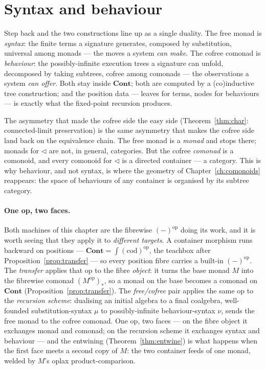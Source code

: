 \documentclass[11pt,a4paper]{book}
\newcommand{\Cont}{\mathbf{Cont}}
\newcommand{\op}{^{\mathrm{op}}}
\newcommand{\cod}{\mathrm{cod}}
\theoremstyle{plain}
\theoremstyle{definition}
\theoremstyle{remark}
\begin{document}
\section{Syntax and behaviour}
\label{sec:moncomon-outlook}

Step back and the two constructions line up as a single duality. The free monad is
\emph{syntax}: the finite terms a signature generates, composed by substitution, universal
among monads --- the moves a system \emph{can make}. The cofree comonad is \emph{behaviour}:
the possibly-infinite execution trees a signature can unfold, decomposed by taking subtrees,
cofree among comonads --- the observations a system \emph{can offer}. Both stay inside
$\Cont$; both are computed by a (co)inductive tree construction; and the position data --- leaves
for terms, nodes for behaviours --- is exactly what the fixed-point recursion produces.

The asymmetry that made the cofree side the easy side (Theorem~\ref{thm:char}: connected-limit
preservation) is the same asymmetry that makes the cofree side land back on the equivalence
chain. The free monad is a \emph{monad} and stops there; monads for $\triangleleft$ are not, in
general, categories. But the cofree \emph{comonad} is a comonoid, and every comonoid for
$\triangleleft$ is a directed container --- a category. This is why behaviour, and not syntax,
is where the geometry of Chapter~\ref{ch:comonoids} reappears: the space of behaviours of any
container is organised by its subtree category.

\paragraph{One op, two faces.} Both machines of this chapter are the fibrewise $(-)\op$ doing its
work, and it is worth seeing that they apply it to \emph{different targets}. A container morphism
runs backward on positions --- $\Cont=\int(\cod)\op$, the teachbox after
Proposition~\ref{prop:transfer} --- so every position fibre carries a built-in $(-)\op$. The
\emph{transfer} applies that op to the fibre \emph{object}: it turns the base monad $M$ into the
fibrewise comonad $(M\op)_{*}$, so a monad on the base becomes a comonad on $\Cont$
(Proposition~\ref{prop:transfer}). The \emph{free/cofree} pair applies the same op to the
\emph{recursion scheme}: dualising an initial algebra to a final coalgebra, well-founded
substitution-syntax $\mu$ to possibly-infinite behaviour-syntax $\nu$, sends the free monad to the
cofree comonad. One op, two faces --- on the fibre object it exchanges monad and comonad; on the
recursion scheme it exchanges syntax and behaviour --- and the entwining
(Theorem~\ref{thm:entwine}) is what happens when the first face meets a second copy of $M$: the two
container feeds of one monad, welded by $M$'s oplax product-comparison.
\end{document}
